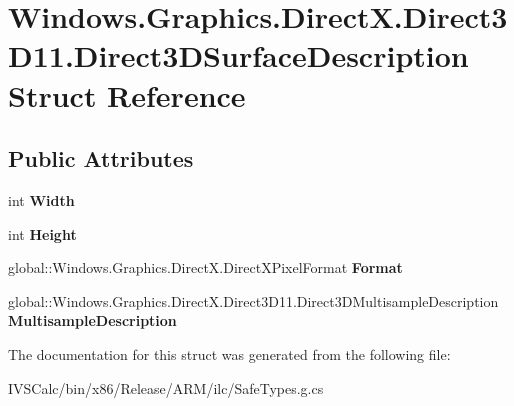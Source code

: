 \hypertarget{struct_windows_1_1_graphics_1_1_direct_x_1_1_direct3_d11_1_1_direct3_d_surface_description}{}\section{Windows.\+Graphics.\+Direct\+X.\+Direct3\+D11.\+Direct3\+D\+Surface\+Description Struct Reference}
\label{struct_windows_1_1_graphics_1_1_direct_x_1_1_direct3_d11_1_1_direct3_d_surface_description}
\subsection*{Public Attributes}
\begin{DoxyCompactItemize}
\item 
\mbox{\label{struct_windows_1_1_graphics_1_1_direct_x_1_1_direct3_d11_1_1_direct3_d_surface_description_a05854749af3491abc8708486dfcae733}} 
int {\bfseries Width}
\item 
\mbox{\label{struct_windows_1_1_graphics_1_1_direct_x_1_1_direct3_d11_1_1_direct3_d_surface_description_a51451a1da80e10cb8be9f1a8df3d0cce}} 
int {\bfseries Height}
\item 
\mbox{\label{struct_windows_1_1_graphics_1_1_direct_x_1_1_direct3_d11_1_1_direct3_d_surface_description_a1946bffa374306afbe4996d32f7d2a78}} 
global\+::\+Windows.\+Graphics.\+Direct\+X.\+Direct\+X\+Pixel\+Format {\bfseries Format}
\item 
\mbox{\label{struct_windows_1_1_graphics_1_1_direct_x_1_1_direct3_d11_1_1_direct3_d_surface_description_ad4fd64dfe64e328a09929925c02429d6}} 
global\+::\+Windows.\+Graphics.\+Direct\+X.\+Direct3\+D11.\+Direct3\+D\+Multisample\+Description {\bfseries Multisample\+Description}
\end{DoxyCompactItemize}


The documentation for this struct was generated from the following file\+:\begin{DoxyCompactItemize}
\item 
I\+V\+S\+Calc/bin/x86/\+Release/\+A\+R\+M/ilc/Safe\+Types.\+g.\+cs\end{DoxyCompactItemize}
